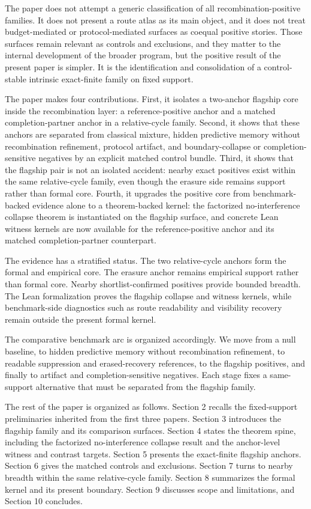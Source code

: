 \documentclass[11pt]{article}
\theoremstyle{definition}
\begin{document}
The paper does not attempt a generic classification of all recombination-positive families. It does not present a route atlas as its main object, and it does not treat budget-mediated or protocol-mediated surfaces as coequal positive stories. Those surfaces remain relevant as controls and exclusions, and they matter to the internal development of the broader program, but the positive result of the present paper is simpler. It is the identification and consolidation of a control-stable intrinsic exact-finite family on fixed support.

The paper makes four contributions. First, it isolates a two-anchor flagship core inside the recombination layer: a reference-positive anchor and a matched completion-partner anchor in a relative-cycle family. Second, it shows that these anchors are separated from classical mixture, hidden predictive memory without recombination refinement, protocol artifact, and boundary-collapse or completion-sensitive negatives by an explicit matched control bundle. Third, it shows that the flagship pair is not an isolated accident: nearby exact positives exist within the same relative-cycle family, even though the erasure side remains support rather than formal core. Fourth, it upgrades the positive core from benchmark-backed evidence alone to a theorem-backed kernel: the factorized no-interference collapse theorem is instantiated on the flagship surface, and concrete Lean witness kernels are now available for the reference-positive anchor and its matched completion-partner counterpart.

The evidence has a stratified status. The two relative-cycle anchors form the formal and empirical core. The erasure anchor remains empirical support rather than formal core. Nearby shortlist-confirmed positives provide bounded breadth. The Lean formalization proves the flagship collapse and witness kernels, while benchmark-side diagnostics such as route readability and visibility recovery remain outside the present formal kernel.

The comparative benchmark arc is organized accordingly. We move from a null baseline, to hidden predictive memory without recombination refinement, to readable suppression and erased-recovery references, to the flagship positives, and finally to artifact and completion-sensitive negatives. Each stage fixes a same-support alternative that must be separated from the flagship family.

The rest of the paper is organized as follows. Section 2 recalls the fixed-support preliminaries inherited from the first three papers. Section 3 introduces the flagship family and its comparison surfaces. Section 4 states the theorem spine, including the factorized no-interference collapse result and the anchor-level witness and contrast targets. Section 5 presents the exact-finite flagship anchors. Section 6 gives the matched controls and exclusions. Section 7 turns to nearby breadth within the same relative-cycle family. Section 8 summarizes the formal kernel and its present boundary. Section 9 discusses scope and limitations, and Section 10 concludes.
\end{document}
